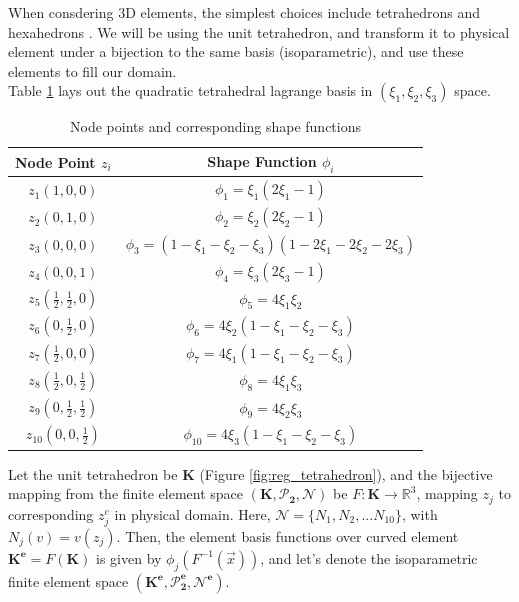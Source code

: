 \documentclass{article}
\begin{document}
When consdering 3D elements, the simplest choices include tetrahedrons and hexahedrons \cite{3d-elements}. We will be
using the unit tetrahedron, and transform it to physical element under a bijection to the same basis (isoparametric), 
and use these elements to fill our domain. \\

Table \ref{tab:shape_functions} lays out the quadratic tetrahedral lagrange basis in $(\xi_1, \xi_2, \xi_3)$ space. \\

\begin{table}[h!]
\centering
\renewcommand{\arraystretch}{1.5}
\begin{tabular}{|c|c|}
\hline
\textbf{Node Point $z_i$} & \textbf{Shape Function $\phi_i$} \\
\hline
$z_1(1,0,0)$ & $\phi_1 = \xi_1(2\xi_1 - 1)$ \\
\hline
$z_2(0,1,0)$ & $\phi_2 = \xi_2(2\xi_2 - 1)$ \\
\hline
$z_3(0,0,0)$ & $\phi_3 = (1 - \xi_1 - \xi_2 - \xi_3)(1 - 2\xi_1 - 2\xi_2 - 2\xi_3)$ \\
\hline
$z_4(0,0,1)$ & $\phi_4 = \xi_3(2\xi_3 - 1)$ \\
\hline
$z_5(\frac{1}{2},\frac{1}{2},0)$ & $\phi_5 = 4\xi_1\xi_2$ \\
\hline
$z_6(0,\frac{1}{2},0)$ & $\phi_6 = 4\xi_2(1 - \xi_1 - \xi_2 - \xi_3)$ \\
\hline
$z_7(\frac{1}{2},0,0)$ & $\phi_7 = 4\xi_1(1 - \xi_1 - \xi_2 - \xi_3)$ \\
\hline
$z_8(\frac{1}{2},0,\frac{1}{2})$ & $\phi_8 = 4\xi_1\xi_3$ \\
\hline
$z_9(0,\frac{1}{2},\frac{1}{2})$ & $\phi_9 = 4\xi_2\xi_3$ \\
\hline
$z_{10}(0,0,\frac{1}{2})$ & $\phi_{10} = 4\xi_3(1 - \xi_1 - \xi_2 - \xi_3)$ \\
\hline
\end{tabular}
\caption{Node points and corresponding shape functions}
\label{tab:shape_functions}
\end{table}

Let the unit tetrahedron be $\boldsymbol{K}$ (Figure \ref{fig:reg_tetrahedron}), and the bijective mapping
from the finite element space $(\boldsymbol{K},\boldsymbol{\mathcal{P}_2},\boldsymbol{\mathcal{N}})$ be 
$F:\boldsymbol{K} \rightarrow \mathbb{R}^3$, mapping $z_j$ to corresponding $z_j^e$ in physical domain. 
Here, $\boldsymbol{\mathcal{N}}=\{N_1, N_2, ... N_{10}\}$, with $N_j(v) = v(z_j)$. Then, the element basis 
functions over curved element $\boldsymbol{K^e} = F(\boldsymbol{K})$ is given by $\phi_j(F^{-1}(\overrightarrow{x}))$,
and let's denote the isoparametric finite element space 
$(\boldsymbol{K^e},\boldsymbol{\mathcal{P}_2^e},\boldsymbol{\mathcal{N}^e})$.
\end{document}
